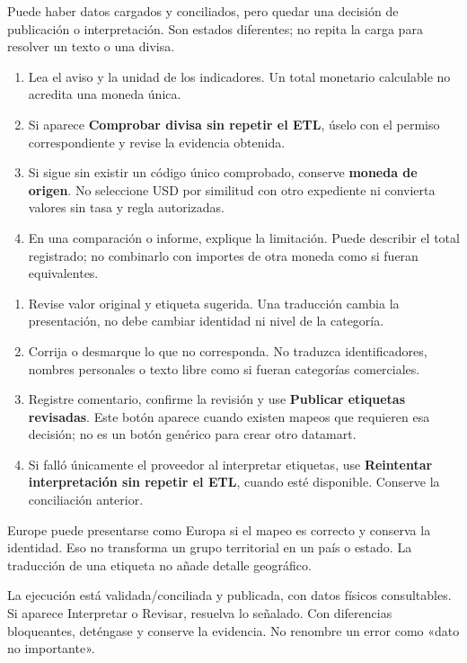 Puede haber datos cargados y conciliados, pero quedar una decisión de publicación o interpretación. Son estados diferentes; no repita la carga para resolver un texto o una divisa.
\begin{enumerate}
\item Lea el aviso y la unidad de los indicadores. Un total monetario calculable no acredita una moneda única.
\item Si aparece \textbf{Comprobar divisa sin repetir el ETL}, úselo con el permiso correspondiente y revise la evidencia obtenida.
\item Si sigue sin existir un código único comprobado, conserve \textbf{moneda de origen}. No seleccione USD por similitud con otro expediente ni convierta valores sin tasa y regla autorizadas.
\item En una comparación o informe, explique la limitación. Puede describir el total registrado; no combinarlo con importes de otra moneda como si fueran equivalentes.
\end{enumerate}
\begin{enumerate}
\item Revise valor original y etiqueta sugerida. Una traducción cambia la presentación, no debe cambiar identidad ni nivel de la categoría.
\item Corrija o desmarque lo que no corresponda. No traduzca identificadores, nombres personales o texto libre como si fueran categorías comerciales.
\item Registre comentario, confirme la revisión y use \textbf{Publicar etiquetas revisadas}. Este botón aparece cuando existen mapeos que requieren esa decisión; no es un botón genérico para crear otro datamart.
\item Si falló únicamente el proveedor al interpretar etiquetas, use \textbf{Reintentar interpretación sin repetir el ETL}, cuando esté disponible. Conserve la conciliación anterior.
\end{enumerate}
\begin{note}
Europe puede presentarse como Europa si el mapeo es correcto y conserva la identidad. Eso no transforma un grupo territorial en un país o estado. La traducción de una etiqueta no añade detalle geográfico.
\end{note}
\begin{good}
La ejecución está validada/conciliada y publicada, con datos físicos consultables. Si aparece Interpretar o Revisar, resuelva lo señalado. Con diferencias bloqueantes, deténgase y conserve la evidencia. No renombre un error como «dato no importante».
\end{good}

